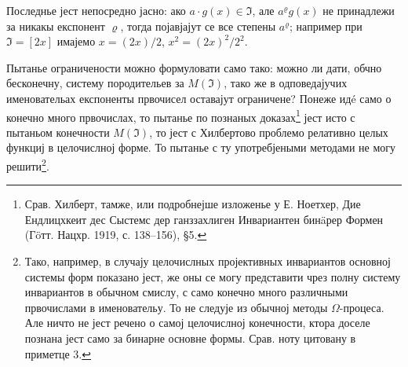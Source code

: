\documentclass[11pt]{article}
\begin{document}
Последнье јест непосредно јасно: ако \(a\cdot g(x)\in\mathfrak{I}\), але \(a^\varrho g(x)\) не принадлежи за никакы експонент \(\varrho\), тогда појавјајут се все степены \(a^\varrho\); например при \(\mathfrak{I}=[2x]\) имајемо \(x=(2x)/2\), \(x^2=(2x)^2/2^2\).

Пытанье ограничености можно формуловати само тако: можно ли дати, обчно бесконечну, систему породительев за \(M(\mathfrak{I})\), тако же в одповедајучих именовательах експоненты првочисел оставајут ограничене? Понеже идé само о конечно много првочислах, то пытанье по познаных доказах\footnote{Срав. Хилберт, тамже, или подробнејше изложенье у Е. Ноетхер, Дие Ендлицхкеит дес Сыстемс дер ганззахлиген Инвариантен бинäрер Формен (Гöтт. Нацхр. 1919, с. 138--156), §5.} јест исто с пытаньом конечности \(M(\mathfrak{I})\), то јест с Хилбертово проблемо релативно целых функциј в целочислној форме. То пытанье с ту употребјеными методами не могу решити\footnote{Тако, например, в случају целочислных пројективных инвариантов основној системы форм показано јест, же оны се могу представити чрез полну систему инвариантов в обычном смислу, с само конечно много различными првочислами в именовательу. То не следује из обычној методы \(\Omega\)-процеса. Але ничто не јест речено о самој целочислној конечности, ктора доселе познана јест само за бинарне основне формы. Срав. ноту цитовану в приметце 3.}.
\end{document}

